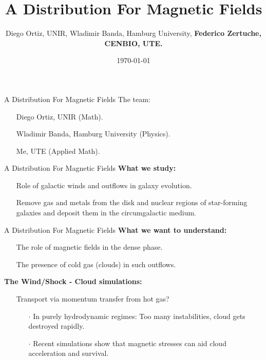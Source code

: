 \documentclass{beamer}
\title{A Distribution For Magnetic Fields}
\author{Diego Ortiz, UNIR, Wladimir Banda, Hamburg University, \textbf{Federico Zertuche, CENBIO, UTE.}}
\date{\today}
\begin{document}
\begin{frame}
\titlepage
\end{frame}

\begin{frame}{A Distribution For Magnetic Fields}
The team:
\begin{itemize}
  \item[] Diego Ortiz, UNIR (Math).
  \item[] Wladimir Banda, Hamburg University (Physics).
  \item[] Me, UTE (Applied Math).
\end{itemize}
\end{frame}


\begin{frame}{A Distribution For Magnetic Fields}
 \textbf{What we study:}
 \begin{itemize}
  \setlength\itemsep{1em}
  \item[] Role of galactic winds and outflows in galaxy evolution.
  \item[] Remove gas and metals from the disk and nuclear regions of star-forming galaxies and deposit them in the circumgalactic medium.
\end{itemize}
\begin{center}
\end{center}
\end{frame}


\begin{frame}{A Distribution For Magnetic Fields}
  \textbf{What we want to understand:}
\begin{itemize}
  \item[] The role of magnetic fields in the dense phase.
  \item[] The presence of cold gas (clouds) in such outflows.
\end{itemize}


\textbf{The Wind/Shock - Cloud simulations:}
\begin{itemize}
  \item[] Transport via momentum transfer from hot gas?
  \begin{itemize}
    \item[$\cdot$] In purely hydrodynamic regimes: Too many instabilities, cloud gets destroyed rapidly.
    \item[$\cdot$] Recent simulations show that magnetic stresses can aid cloud acceleration and survival.
  \end{itemize}
\end{itemize}
\end{frame}
\end{document}
